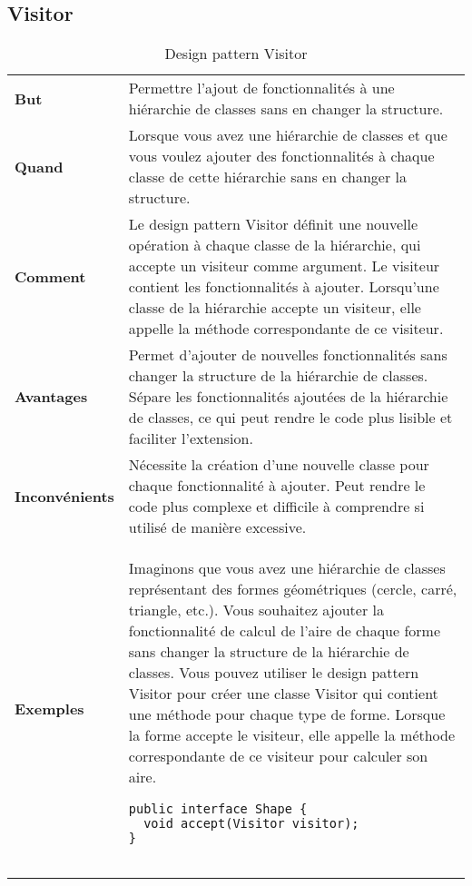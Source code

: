 


\newpage
\subsection{Visitor}\label{subsec:visitor}
\begin{minipage}[t]{1\textwidth}
\begin{definition}
\end{definition}


\begin{table}[H]
\caption{Design pattern Visitor}
\label{tbl:design_patterns_visitor}
\begin{adjustbox}{max width=\textwidth}
\begin{tabular}{l|p{\textwidth}}
\toprule
\textbf{But} & Permettre l'ajout de fonctionnalités à une hiérarchie de classes sans en changer la structure. \\
\cmidrule(lr){1-2}
\textbf{Quand} & Lorsque vous avez une hiérarchie de classes et que vous voulez ajouter des fonctionnalités à chaque classe de cette hiérarchie sans en changer la structure. \\
\cmidrule(lr){1-2}
\textbf{Comment} & Le design pattern Visitor définit une nouvelle opération à chaque classe de la hiérarchie, qui accepte un visiteur comme argument. Le visiteur contient les fonctionnalités à ajouter. Lorsqu'une classe de la hiérarchie accepte un visiteur, elle appelle la méthode correspondante de ce visiteur. \\
\cmidrule(lr){1-2}
\textbf{Avantages} & Permet d'ajouter de nouvelles fonctionnalités sans changer la structure de la hiérarchie de classes. Sépare les fonctionnalités ajoutées de la hiérarchie de classes, ce qui peut rendre le code plus lisible et faciliter l'extension. \\
\cmidrule(lr){1-2}
\textbf{Inconvénients} & Nécessite la création d'une nouvelle classe pour chaque fonctionnalité à ajouter. Peut rendre le code plus complexe et difficile à comprendre si utilisé de manière excessive. \\
\cmidrule(lr){1-2}
\multirow{2}{*}{\textbf{Exemples}} & 
\hspace{4mm}
\begin{minipage}[tl]{0.5\textwidth}
Imaginons que vous avez une hiérarchie de classes représentant des formes géométriques (cercle, carré, triangle, etc.). Vous souhaitez ajouter la fonctionnalité de calcul de l'aire de chaque forme sans changer la structure de la hiérarchie de classes. Vous pouvez utiliser le design pattern Visitor pour créer une classe Visitor qui contient une méthode pour chaque type de forme. Lorsque la forme accepte le visiteur, elle appelle la méthode correspondante de ce visiteur pour calculer son aire.  
\begin{lstlisting}[style=monstyle]
public interface Shape {
  void accept(Visitor visitor);
}


\end{lstlisting}
\end{minipage}
\end{tabular}
\end{adjustbox}
\end{table}
\end{minipage}
